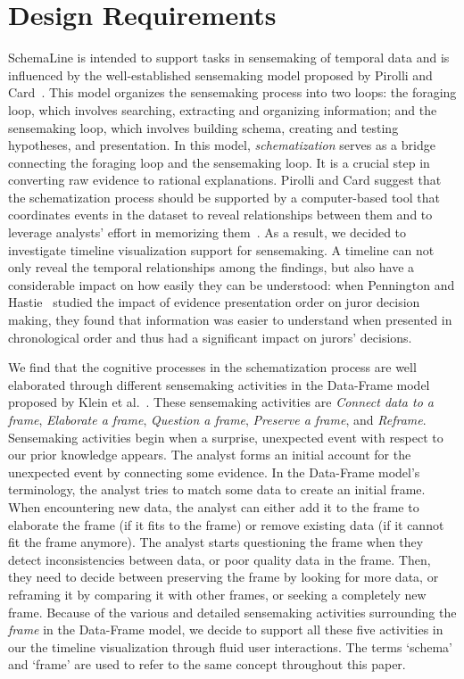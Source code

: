\section{Design Requirements}

SchemaLine is intended to support tasks in sensemaking of temporal data and is influenced by the well-established sensemaking model proposed by Pirolli and Card~\cite{Pirolli2005}. This model organizes the sensemaking process into two loops: the foraging loop, which involves searching, extracting and organizing information; and the sensemaking loop, which involves building schema, creating and testing hypotheses, and presentation. In this model, \emph{schematization} serves as a bridge connecting the foraging loop and the sensemaking loop. It is a crucial step in converting raw evidence to rational explanations. Pirolli and Card suggest that the schematization process should be supported by a computer-based tool that coordinates events in the dataset to reveal relationships between them and to leverage analysts' effort in memorizing them~\cite{Pirolli2005}. As a result, we decided to investigate timeline visualization support for sensemaking. A timeline can not only reveal the temporal relationships among the findings, but also have a considerable impact on how easily they can be understood: when Pennington and Hastie~\cite{Pennington1991} studied the impact of evidence presentation order on juror decision making, they found that information was easier to understand when presented in chronological order and thus had a significant impact on jurors' decisions. 

We find that the cognitive processes in the schematization process are well elaborated through different sensemaking activities in the Data-Frame model proposed by Klein et al.~\cite{Klein2003}. These sensemaking activities are \emph{Connect data to a frame}, \emph{Elaborate a frame}, \emph{Question a frame}, \emph{Preserve a frame}, and \emph{Reframe}. Sensemaking activities begin when a surprise, unexpected event with respect to our prior knowledge appears. The analyst forms an initial account for the unexpected event by connecting some evidence. In the Data-Frame model's terminology, the analyst tries to match some data to create an initial frame. When encountering new data, the analyst can either add it to the frame to elaborate the frame (if it fits to the frame) or remove existing data (if it cannot fit the frame anymore). The analyst starts questioning the frame when they detect inconsistencies between data, or poor quality data in the frame. Then, they need to decide between preserving the frame by looking for more data, or reframing it by comparing it with other frames, or seeking a completely new frame. Because of the various and detailed sensemaking activities surrounding the \textit{frame} in the Data-Frame model, we decide to support all these five activities in our the timeline visualization through fluid user interactions. The terms `schema' and `frame' are used to refer to the same concept throughout this paper.

